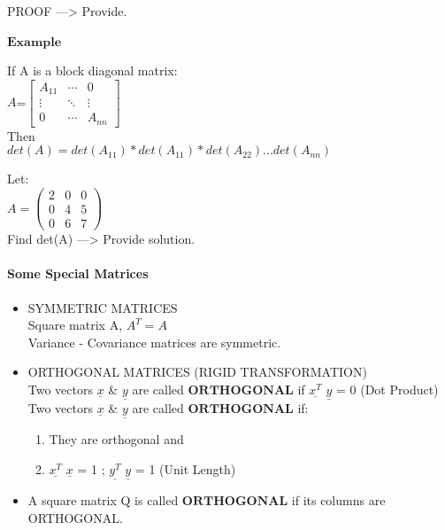 \documentclass[]{article}
\let\oldparagraph\paragraph
\renewcommand{\paragraph}[1]{\oldparagraph{#1}\mbox{}}
\begin{document}
PROOF ---\textgreater{} Provide.

\(\mathbf{Example}\)~

If A is a block diagonal matrix:\\

\(A\)=\(\begin{bmatrix} A_{11} & \cdots & 0 \\ \vdots & \ddots & \vdots \\ 0 & \cdots & A_{nn} \end{bmatrix}\)\\[2\baselineskip]Then\\
 \(det(A)=det(A_{11})*det(A_{11})*det(A_{22})...det(A_{nn})\)

Let:\\

\(A =\begin{pmatrix} 2 & 0 & 0\\ 0 & 4 & 5 \\ 0 & 6 & 7 \end{pmatrix}\)\\

Find det(A) ---\textgreater{} Provide solution.

\paragraph{\texorpdfstring{Some Special Matrices\\
}{Some Special Matrices }}\label{some-special-matrices}

\begin{itemize}
\item
  SYMMETRIC MATRICES\\

  Square matrix A, \(A^{T}=A\)\\
   Variance - Covariance matrices are symmetric.\\
\item
  ORTHOGONAL MATRICES (RIGID TRANSFORMATION)\\

  Two vectors \(\underline{x}\) \& \(\underline{y}\) are called
  \(\textbf{ORTHOGONAL}\) if \(\underline{x^{T}}\) \(\underline{y}\) = 0
  (Dot Product)\\

  Two vectors \(\underline{x}\) \& \(\underline{y}\) are called
  \(\textbf{ORTHOGONAL}\) if:\\

  \begin{enumerate}
  \def\labelenumi{\arabic{enumi})}
  \item
    They are orthogonal and
  \item
    \(\underline{x^{T}}\) \(\underline{x}\) = 1 ; \(\underline{y^{T}}\)
    \(\underline{y}\) = 1 (Unit Length)\\
  \end{enumerate}
\item
  A square matrix Q is called \(\textbf{ORTHOGONAL}\) if its columns are
  ORTHOGONAL.\\
\end{itemize}
\end{document}
